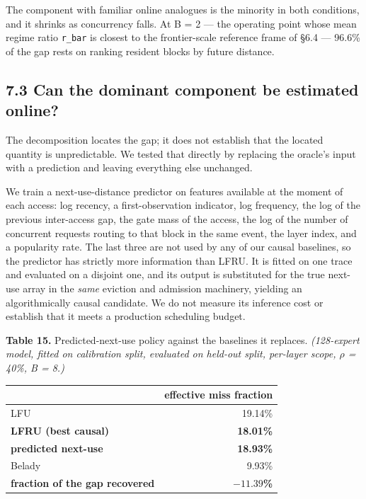 \documentclass[
  10pt,
  letterpaper,
  10pt]{article}
\newcounter{none} %
\begin{document}
The component with familiar online analogues is the minority in both
conditions, and it shrinks as concurrency falls. At B = 2 --- the
operating point whose mean regime ratio \texttt{r\_bar} is closest to
the frontier-scale reference frame of §6.4 --- 96.6\% of the gap rests
on ranking resident blocks by future distance.

\subsection{7.3 Can the dominant component be estimated
online?}\label{can-the-dominant-component-be-estimated-online}

The decomposition locates the gap; it does not establish that the
located quantity is unpredictable. We tested that directly by replacing
the oracle's input with a prediction and leaving everything else
unchanged.

We train a next-use-distance predictor on features available at the
moment of each access: log recency, a first-observation indicator, log
frequency, the log of the previous inter-access gap, the gate mass of
the access, the log of the number of concurrent requests routing to that
block in the same event, the layer index, and a popularity rate. The
last three are not used by any of our causal baselines, so the predictor
has strictly more information than LFRU. It is fitted on one trace and
evaluated on a disjoint one, and its output is substituted for the true
next-use array in the \emph{same} eviction and admission machinery,
yielding an algorithmically causal candidate. We do not measure its
inference cost or establish that it meets a production scheduling
budget.

\textbf{Table 15.} Predicted-next-use policy against the baselines it
replaces. \emph{(128-expert model, fitted on calibration split,
evaluated on held-out split, per-layer scope, \(\rho\) = 40\%, B = 8.)}

{\def\LTcaptype{none} %
\begin{longtable}[]{@{}lr@{}}
\toprule\noalign{}
& effective miss fraction \\
\midrule\noalign{}
\endhead
\bottomrule\noalign{}
\endlastfoot
LFU & 19.14\% \\
\textbf{LFRU (best causal)} & \textbf{18.01\%} \\
\textbf{predicted next-use} & \textbf{18.93\%} \\
Belady & 9.93\% \\
\textbf{fraction of the gap recovered} & \textbf{\(-11.39\)\%} \\
\end{longtable}
}
\end{document}
